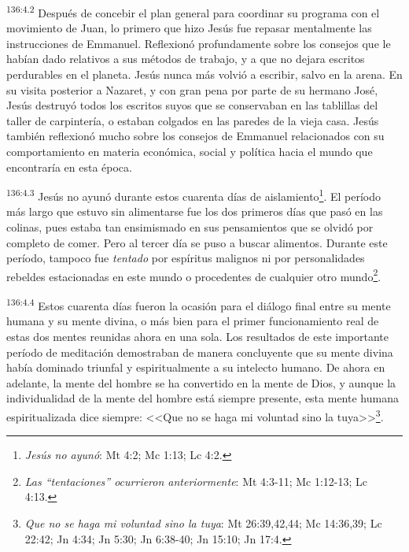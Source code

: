 \par 
\textsuperscript{136:4.2} Después de concebir el plan general para coordinar su programa con el movimiento de Juan, lo primero que hizo Jesús fue repasar mentalmente las instrucciones de Emmanuel. Reflexionó profundamente sobre los consejos que le habían dado relativos a sus métodos de trabajo, y a que no dejara escritos perdurables en el planeta. Jesús nunca más volvió a escribir, salvo en la arena. En su visita posterior a Nazaret, y con gran pena por parte de su hermano José, Jesús destruyó todos los escritos suyos que se conservaban en las tablillas del taller de carpintería, o estaban colgados en las paredes de la vieja casa. Jesús también reflexionó mucho sobre los consejos de Emmanuel relacionados con su comportamiento en materia económica, social y política hacia el mundo que encontraría en esta época.

\par 
\textsuperscript{136:4.3} Jesús no ayunó durante estos cuarenta días de aislamiento\footnote{\textit{Jesús no ayunó}: Mt 4:2; Mc 1:13; Lc 4:2.}. El período más largo que estuvo sin alimentarse fue los dos primeros días que pasó en las colinas, pues estaba tan ensimismado en sus pensamientos que se olvidó por completo de comer. Pero al tercer día se puso a buscar alimentos. Durante este período, tampoco fue \textit{tentado} por espíritus malignos ni por personalidades rebeldes estacionadas en este mundo o procedentes de cualquier otro mundo\footnote{\textit{Las ``tentaciones'' ocurrieron anteriormente}: Mt 4:3-11; Mc 1:12-13; Lc 4:13.}.

\par 
\textsuperscript{136:4.4} Estos cuarenta días fueron la ocasión para el diálogo final entre su mente humana y su mente divina, o más bien para el primer funcionamiento real de estas dos mentes reunidas ahora en una sola. Los resultados de este importante período de meditación demostraban de manera concluyente que su mente divina había dominado triunfal y espiritualmente a su intelecto humano. De ahora en adelante, la mente del hombre se ha convertido en la mente de Dios, y aunque la individualidad de la mente del hombre está siempre presente, esta mente humana espiritualizada dice siempre: <<Que no se haga mi voluntad sino la tuya>>\footnote{\textit{Que no se haga mi voluntad sino la tuya}: Mt 26:39,42,44; Mc 14:36,39; Lc 22:42; Jn 4:34; Jn 5:30; Jn 6:38-40; Jn 15:10; Jn 17:4.}.

